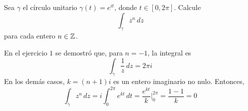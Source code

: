 \begin{exercise}
Sea $\gamma$ el círculo unitario $\gamma(t) = e^{it}$, donde $t \in [0, 2\pi]$. Calcule
$$\int_\gamma z^n \, dz$$
para cada entero $n \in \mathbb Z$.
\end{exercise}

\begin{solution}
En el ejercicio $1$ se demostró que, para $n = -1$, la integral es
$$\int_\gamma \frac 1z \, dz = 2\pi i$$
En los demás casos, $k = (n + 1) i$ es un entero imaginario no nulo. Entonces,
$$\int_\gamma z^n \, dz = i \int_0^{2\pi} e^{kt} \, dt = \frac {e^{kt}} k \Bigg \vert_0^{2\pi} = \frac {1 - 1} k = 0$$
\end{solution}
